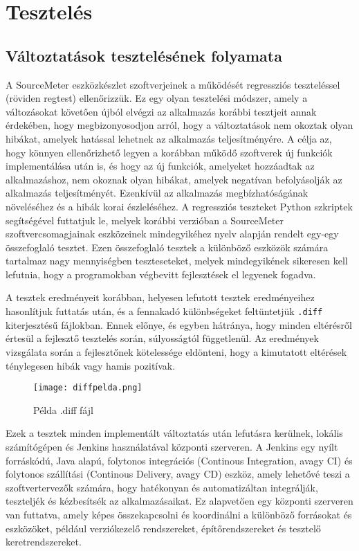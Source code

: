 \chapter{Tesztelés}
\label{chap:fejezet5}

\section{Változtatások tesztelésének folyamata}

A SourceMeter eszközkészlet szoftverjeinek a működését regressziós teszteléssel (röviden regtest) ellenőrizzük. Ez egy olyan tesztelési módszer, amely a változásokat követően újból elvégzi az alkalmazás korábbi tesztjeit annak érdekében, hogy megbizonyosodjon arról, hogy a változtatások nem okoztak olyan hibákat, amelyek hatással lehetnek az alkalmazás teljesítményére.
A célja az, hogy könnyen ellenőrizhető legyen a korábban működő szoftverek új funkciók implementálása után is, és hogy az új funkciók, amelyeket hozzáadtak az alkalmazáshoz, nem okoznak olyan hibákat, amelyek negatívan befolyásolják az alkalmazás teljesítményét. Ezenkívül az alkalmazás megbízhatóságának növeléséhez és a hibák korai észleléséhez.
A regressziós teszteket Python szkriptek segítségével futtatjuk le, melyek korábbi verzióban a SourceMeter szoftvercsomagjainak eszközeinek mindegyikéhez nyelv alapján rendelt egy-egy összefoglaló tesztet. Ezen összefoglaló tesztek a különböző eszközök számára tartalmaz nagy mennyiségben teszteseteket, melyek mindegyikének sikeresen kell lefutnia, hogy a programokban végbevitt fejlesztések el legyenek fogadva.

A tesztek eredményeit korábban, helyesen lefutott tesztek eredményeihez hasonlítjuk futtatás után, és a fennakadó különbségeket feltüntetjük \texttt{.diff} kiterjesztésű fájlokban. Ennek előnye, és egyben hátránya, hogy minden eltérésről értesül a fejlesztő tesztelés során, súlyosságtól függetlenül. Az eredmények vizsgálata során a fejlesztőnek kötelessége eldönteni, hogy a kimutatott eltérések ténylegesen hibák vagy hamis pozitívak.

\begin{figure}[!htbp]
    \caption{Példa .diff fájl}\label{fig:difffile}
    \centering
    \texttt{[image: diffpelda.png]}
\end{figure}

Ezek a tesztek minden implementált változtatás után lefutásra kerülnek, lokális számítógépen és Jenkins használatával központi szerveren. 
A Jenkins egy nyílt forráskódú, Java alapú, folytonos integrációs (Continous Integration, avagy CI) és folytonos szállítási (Continous Delivery, avagy CD) eszköz, amely lehetővé teszi a szoftvertervezők számára, hogy hatékonyan és automatizáltan integrálják, teszteljék és kézbesítsék az alkalmazásaikat. Ez alapvetően egy központi szerveren van futtatva, amely képes összekapcsolni és koordinálni a különböző forrásokat és eszközöket, például verziókezelő rendszereket, építőrendszereket és tesztelő keretrendszereket.

